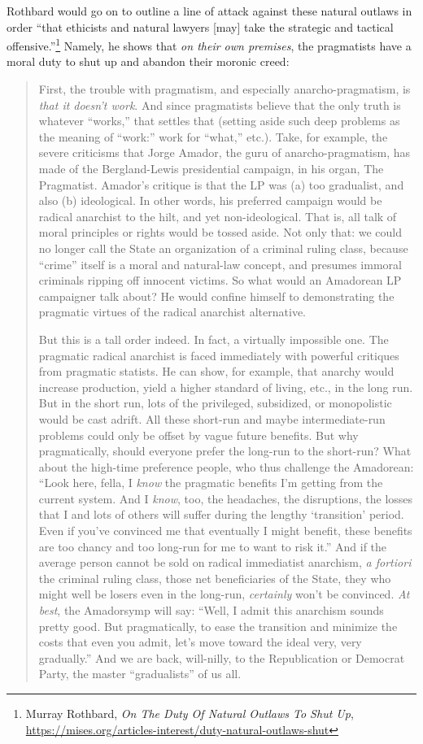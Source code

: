 \documentclass[11pt]{article}
\begin{document}
Rothbard would go on to outline a line of attack against these natural outlaws in order ``that ethicists and natural lawyers [may] take the strategic and tactical offensive.''\footnote{Murray Rothbard, \emph{On The Duty Of Natural Outlaws To Shut Up}, \url{https://mises.org/articles-interest/duty-natural-outlaws-shut}} Namely, he shows that \emph{on their own premises}, the pragmatists have a moral duty to shut up and abandon their moronic creed:
\begin{quote}
First, the trouble with pragmatism, and especially anarcho-pragmatism, is \emph{that it doesn't work}. And since pragmatists believe that the only truth is whatever ``works,'' that settles that (setting aside such deep problems as the meaning of ``work:'' work for ``what,'' etc.). Take, for example, the severe criticisms that Jorge Amador, the guru of anarcho-pragmatism, has made of the Bergland-Lewis presidential campaign, in his organ, The Pragmatist. Amador's critique is that the LP was (a) too gradualist, and also (b) ideological. In other words, his preferred campaign would be radical anarchist to the hilt, and yet non-ideological. That is, all talk of moral principles or rights would be tossed aside. Not only that: we could no longer call the State an organization of a criminal ruling class, because ``crime'' itself is a moral and natural-law concept, and presumes immoral criminals ripping off innocent victims. So what would an Amadorean LP campaigner talk about? He would confine himself to demonstrating the pragmatic virtues of the radical anarchist alternative.

But this is a tall order indeed. In fact, a virtually impossible one. The pragmatic radical anarchist is faced immediately with powerful critiques from pragmatic statists. He can show, for example, that anarchy would increase production, yield a higher standard of living, etc., in the long run. But in the short run, lots of the privileged, subsidized, or monopolistic would be cast adrift. All these short-run and maybe intermediate-run problems could only be offset by vague future benefits. But why pragmatically, should everyone prefer the long-run to the short-run? What about the high-time preference people, who thus challenge the Amadorean: ``Look here, fella, I \emph{know} the pragmatic benefits I’m getting from the current system. And I \emph{know}, too, the headaches, the disruptions, the losses that I and lots of others will suffer during the lengthy `transition' period. Even if you've convinced me that eventually I might benefit, these benefits are too chancy and too long-run for me to want to risk it.'' And if the average person cannot be sold on radical immediatist anarchism, \emph{a fortiori} the criminal ruling class, those net beneficiaries of the State, they who might well be losers even in the long-run, \emph{certainly} won't be convinced. \emph{At best}, the Amadorsymp will say: ``Well, I admit this anarchism sounds pretty good. But pragmatically, to ease the transition and minimize the costs that even you admit, let's move toward the ideal very, very gradually.'' And we are back, will-nilly, to the Republication or Democrat Party, the master ``gradualists'' of us all.


\end{quote}
\end{document}
